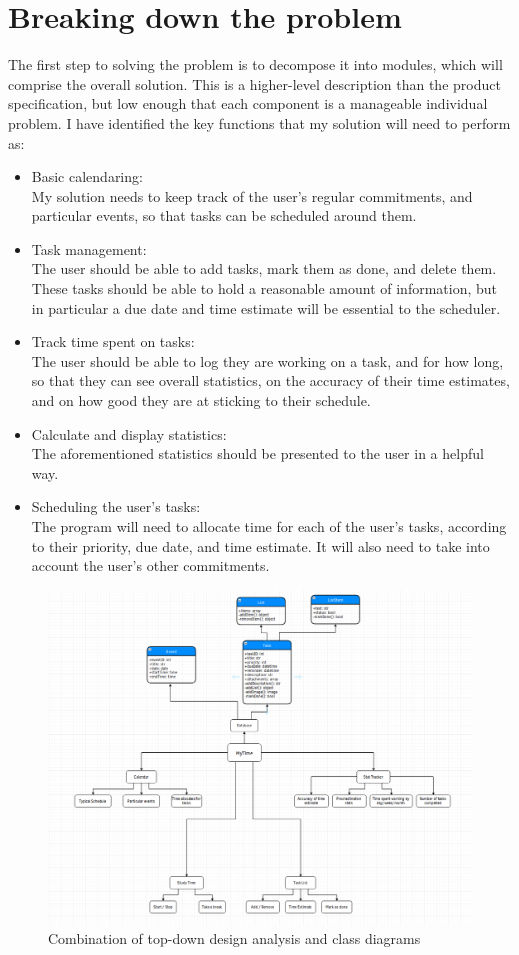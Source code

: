 \documentclass{article}
\begin{document}
\section{Breaking down the problem}
The first step to solving the problem is to decompose it into modules,
which will comprise the overall solution.
This is a higher-level description than the product specification,
but low enough that each component is a manageable individual problem.
I have identified the key functions that my solution will need to perform as:
\begin{itemize}
\item Basic calendaring:\\
  My solution needs to keep track of the user's regular commitments,
  and particular events,
  so that tasks can be scheduled around them.
\item Task management:\\
  The user should be able to add tasks,
  mark them as done,
  and delete them.
  These tasks should be able to hold a reasonable amount of information,
  but in particular a due date and time estimate will be essential to the scheduler.
\item Track time spent on tasks:\\
  The user should be able to log they are working on a task,
  and for how long,
  so that they can see overall statistics,
  on the accuracy of their time estimates,
  and on how good they are at sticking to their schedule.
\item Calculate and display statistics:\\
  The aforementioned statistics should be presented to the user in a helpful way.
\item Scheduling the user's tasks:\\
  The program will need to allocate time for each of the user's tasks,
  according to their priority,
  due date,
  and time estimate.
  It will also need to take into account the user's other commitments.
\end{itemize}

\begin{figure}[h]
  \includegraphics[width=\linewidth]{Images/TDD.png}
  \caption{Combination of top-down design analysis and class diagrams}
  \label{fig:TDD1}
\end{figure}
\end{document}
